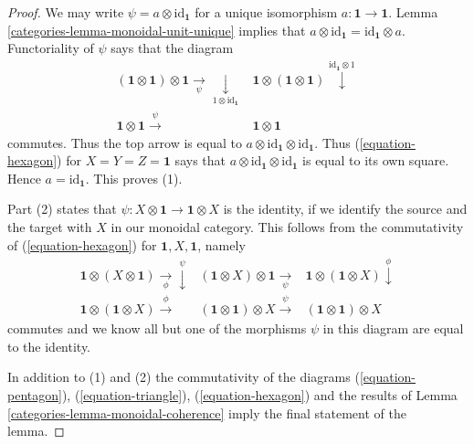 \begin{proof}

We may write $\psi = a \otimes \text{id}_\mathbf{1}$ for a unique
isomorphism $a : \mathbf{1} \to \mathbf{1}$.
Lemma \ref{categories-lemma-monoidal-unit-unique} implies that
$a \otimes \text{id}_\mathbf{1} = \text{id}_\mathbf{1} \otimes a$.
Functoriality of $\psi$ says that the diagram
$$
\begin{array}{cc}(\mathbf{1} \otimes \mathbf{1}) \otimes \mathbf{1}
\underset{\psi}{\longrightarrow}\underset{1 \otimes \text{id}_\mathbf{1}}{\downarrow} & \mathbf{1} \otimes (\mathbf{1} \otimes \mathbf{1})
\overset{\text{id}_\mathbf{1} \otimes 1}{\downarrow} \\ \mathbf{1} \otimes \mathbf{1}  \overset{\psi}{\longrightarrow} & \mathbf{1} \otimes \mathbf{1}\end{array}
$$
commutes. Thus the top arrow is equal to
$a \otimes \text{id}_\mathbf{1} \otimes \text{id}_\mathbf{1}$.
Thus (\ref{equation-hexagon}) for $X = Y = Z = \mathbf{1}$ says that
$a \otimes \text{id}_\mathbf{1} \otimes \text{id}_\mathbf{1}$
is equal to its own square. Hence $a = \text{id}_\mathbf{1}$.
This proves (1).

\medskip\noindent
Part (2) states that $\psi : X \otimes \mathbf{1} \to \mathbf{1} \otimes X$
is the identity, if we identify the source and the target with $X$
in our monoidal category. This follows from the commutativity of
(\ref{equation-hexagon}) for $\mathbf{1}, X, \mathbf{1}$, namely
$$
\begin{array}{ccc}\mathbf{1} \otimes (X \otimes \mathbf{1}) \underset{\phi}{\longrightarrow}\overset{\psi}{\downarrow} & (\mathbf{1} \otimes X) \otimes \mathbf{1} \underset{\psi}{\longrightarrow} & \mathbf{1} \otimes (\mathbf{1} \otimes X) \overset{\phi}{\downarrow} \\ \mathbf{1} \otimes (\mathbf{1} \otimes X) \overset{\phi}{\longrightarrow} & (\mathbf{1} \otimes \mathbf{1}) \otimes X \overset{\psi}{\longrightarrow} & (\mathbf{1} \otimes \mathbf{1}) \otimes X\end{array}
$$
commutes and we know all but one of the morphisms $\psi$
in this diagram are equal to the identity.

\medskip\noindent
In addition to (1) and (2) the commutativity of the diagrams
(\ref{equation-pentagon}), (\ref{equation-triangle}), (\ref{equation-hexagon})
and the results of Lemma \ref{categories-lemma-monoidal-coherence}
imply the final statement of the lemma.
\end{proof}

